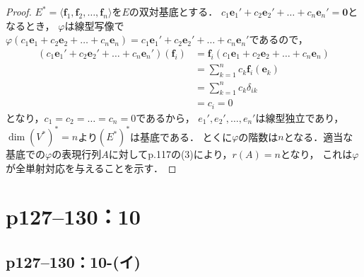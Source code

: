 \documentclass[a4paper,10pt,fleqn]{ltjsarticle}
\begin{document}
\begin{tleftbar}
\begin{proof}
        $ E^\ast = \langle \bm{f}_1 , \bm{f}_2 , \dots , \bm{f}_n \rangle$を$E$の双対基底とする．
        $ c_1 \bm{e}_1 ' + c_2 \bm{e}_2 ' + \dots + c_n \bm{e}_n ' = \bm{0}$となるとき，
        $\varphi$は線型写像で$\varphi (c_1 \bm{e}_1 + c_2 \bm{e}_2 + \dots + c_n \bm{e}_n) = c_1 \bm{e}_1 ' + c_2 \bm{e}_2 ' + \dots + c_n \bm{e}_n '$であるので，
        \begin{align*}
            (c_1 \bm{e}_1 ' + c_2 \bm{e}_2 ' + \dots + c_n \bm{e}_n ') (\bm{f}_i) & = \bm{f}_i (c_1 \bm{e}_1 + c_2 \bm{e}_2 + \dots + c_n \bm{e}_n) \\
                                                                                  & = \sum_{k=1}^{n} c_k \bm{f}_i (\bm{e}_k)                        \\
                                                                                  & = \sum_{k=1}^{n} c_k \delta_{ik}                                \\
                                                                                  & = c_i=0
        \end{align*}
        となり，$c_1 = c_2 = \dots = c_n = 0$であるから，
        $e_1 ' , e_2 ' , \dots , e_n '$は線型独立であり，
        $\dim (V^\ast)^\ast = n $より$(E^\ast)^\ast$は基底である．
        とくに$\varphi$の階数は$n$となる．適当な基底での$\varphi$の表現行列$A$に対してp.117の(3)により，$r(A)=n$となり，
        これは$\varphi$が全単射対応を与えることを示す．
    \end{proof}
\end{tleftbar}


\newpage


\section*{p127--130：10}


\subsection*{p127--130：10-(イ)}
\end{document}
